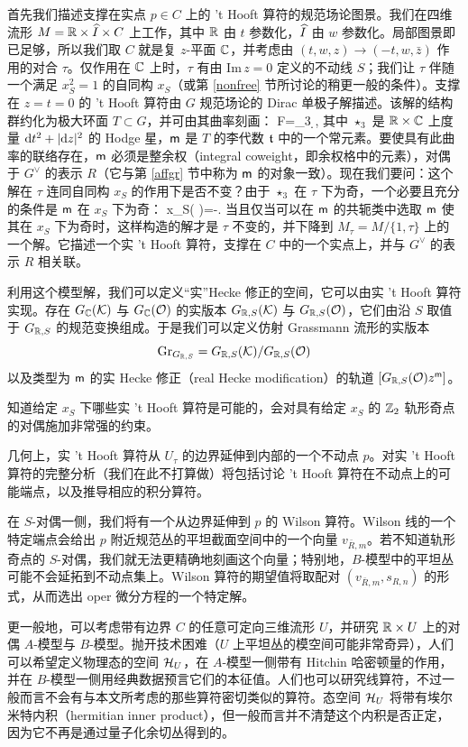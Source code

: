 首先我们描述支撑在实点 $p\in C$ 上的 't Hooft 算符的规范场论图景。我们在四维流形 $M=\R\times \h I\times C$ 上工作，其中 $\R$ 由 $t$ 参数化，$\h I$ 由 $w$ 参数化。局部图景即已足够，所以我们取 $C$ 就是复 $z$-平面 $\C$，并考虑由 $(t,w,z)\to (-t,w,\bar z)$ 作用的对合 $\tau$。仅作用在 $\C$ 上时，$\tau$ 有由 ${\mathrm{Im}\, z}=0$ 定义的不动线 $S$；我们让 $\tau$ 伴随一个满足 $x_S^2=1$ 的自同构 $x_S$（或第 \ref{nonfree} 节所讨论的稍更一般的条件）。支撑在 $z=t=0$ 的 't Hooft 算符由 $G$ 规范场论的 Dirac 单极子解描述。该解的结构群约化为极大环面 $T\subset G$，并可由其曲率刻画：
\be\label{curv} F=\star_3 \d {}, \ee
其中 $\star_3$ 是 $\R\times\C$ 上度量 $\d t^2+|\d z|^2$ 的 Hodge 星，$\m$ 是 $T$ 的李代数 $\frak t$ 中的一个常元素。要使具有此曲率的联络存在，$\m$ 必须是整余权（integral coweight，即余权格中的元素），对偶于 $G^\vee$ 的表示 $R$（它与第 \ref{affgr} 节中称为 $\m$ 的对象一致）。现在我们要问：这个解在 $\tau$ 连同自同构 $x_S$ 的作用下是否不变？由于 $\star_3$ 在 $\tau$ 下为奇，一个必要且充分的条件是 $\m$ 在 $x_S$ 下为奇：
\be\label{oddurv} x_S( \m )=-\m. \ee
当且仅当可以在 $\m$ 的共轭类中选取 $\m$ 使其在 $x_S$ 下为奇时，这样构造的解才是 $\tau$ 不变的，并下降到 $M_\tau=M/\{1,\tau\}$ 上的一个解。它描述一个实 't Hooft 算符，支撑在 $C$ 中的一个实点上，并与 $G^\vee$ 的表示 $R$ 相关联。

利用这个模型解，我们可以定义“实”Hecke 修正的空间，它可以由实 't Hooft 算符实现。存在 $G_{\C}({\cal K})$ 与 $G_{\C}({\cal O})$ 的实版本 $G_{\R,S}({\cal K})$ 与 $G_{\R,S}({\cal O})$，它们由沿 $S$ 取值于 $G_{\R,S}$ 的规范变换组成。于是我们可以定义仿射 Grassmann 流形的实版本
\begin{equation}
\Gr_{G_{\R,S}} = G_{\R,S}({\cal K})/G_{\R,S}({\cal O})
\end{equation}
以及类型为 $\m$ 的实 Hecke 修正（real Hecke modification）的轨道 $\left[G_{\R,S}({\cal O}) z^\m\right]$。

知道给定 $x_S$ 下哪些实 't Hooft 算符是可能的，会对具有给定 $x_S$ 的 $\Z_2$ 轨形奇点的对偶施加非常强的约束。

几何上，实 't Hooft 算符从 $U_\tau$ 的边界延伸到内部的一个不动点 $p$。对实 't Hooft 算符的完整分析（我们在此不打算做）将包括讨论 't Hooft 算符在不动点上的可能端点，以及推导相应的积分算符。

在 $S$-对偶一侧，我们将有一个从边界延伸到 $p$ 的 Wilson 算符。Wilson 线的一个特定端点会给出 $p$ 附近规范丛的平坦截面空间中的一个向量 $v_{\bar R,m}$。若不知道轨形奇点的 $S$-对偶，我们就无法更精确地刻画这个向量；特别地，$B$-模型中的平坦丛可能不会延拓到不动点集上。Wilson 算符的期望值将取配对 $(v_{\bar R,m}, s_{R,n})$ 的形式，从而选出 oper 微分方程的一个特定解。

更一般地，可以考虑带有边界 $C$ 的任意可定向三维流形 $U$，并研究 $\R\times U$ 上的对偶 $A$-模型与 $B$-模型。抛开技术困难（$U$ 上平坦丛的模空间可能非常奇异），人们可以希望定义物理态的空间 $\H_U$，在 $A$-模型一侧带有 Hitchin 哈密顿量的作用，并在 $B$-模型一侧用经典数据预言它们的本征值。人们也可以研究线算符，不过一般而言不会有与本文所考虑的那些算符密切类似的算符。态空间 $\H_U$ 将带有埃尔米特内积（hermitian inner product），但一般而言并不清楚这个内积是否正定，因为它不再是通过量子化余切丛得到的。
